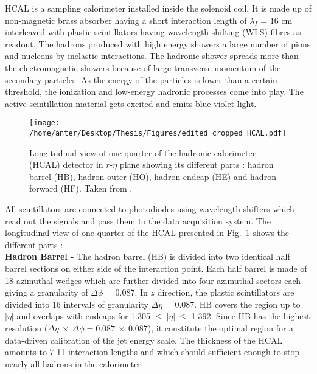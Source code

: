 HCAL is a sampling calorimeter installed inside the solenoid coil. It is made up of non-magnetic brass absorber having a short interaction length of $\lambda_I$ = 16 cm interleaved with plastic scintillators having wavelength-shifting (WLS) fibres as readout. The hadrons produced with high energy showers a large number of pions and nucleons by inelastic interactions. The hadronic shower spreads more than the electromagnetic showers because of large transverse momentum of the secondary particles. As the energy of the particles is lower than a certain threshold, the ionization and low-energy hadronic processes come into play. The active scintillation material gets excited and emits blue-violet light. 
\begin{figure}[!h]
\begin{center}
\vspace*{3mm} 
\hspace*{-5mm}
\texttt{[image: /home/anter/Desktop/Thesis/Figures/edited\_cropped\_HCAL.pdf]}\\
\vspace*{4mm}
\caption[Longitudinal view of one quarter of the hadronic calorimeter (HCAL) detector in $r$-$\eta$ plane.]{Longitudinal view of one quarter of the hadronic calorimeter (HCAL) detector in $r$-$\eta$ plane showing its different parts : hadron barrel (HB), hadron outer (HO), hadron endcap (HE) and hadron forward (HF). Taken from \cite{Chatrchyan:2008aa}.}
\label{fig:hcal}
\end{center}
\end{figure}
All scintillators are connected to photodiodes using wavelength shifters which read out the signals and pass them to the data acquisition system. The longitudinal view of one quarter of the HCAL presented in Fig.~\ref{fig:hcal} shows the different parts : \\\newline
{\bf Hadron Barrel -} The hadron barrel (HB) is divided into two identical half barrel sections on either side of the interaction point. Each half barrel is made of 18 azimuthal wedges which are further divided into four azimuthal sectors each giving a granularity of $\Delta\phi$ = 0.087. In $z$ direction, the plastic scintillators are divided into 16 intervals of granularity $\Delta\eta$ = 0.087. HB covers the region up to $|\eta|$  and overlaps with endcaps for 1.305 $\leq~|\eta|~\leq$ 1.392. Since HB has the highest resolution $(\Delta\eta~\times~\Delta\phi = 0.087~\times~0.087$), it constitute the optimal region for a data-driven calibration of the jet energy scale. The thickness of the HCAL amounts to 7-11 interaction lengths and which should sufficient enough to stop nearly all hadrons in the calorimeter.\\\newline
